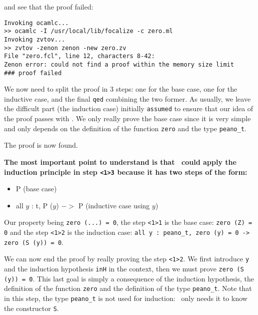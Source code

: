 \documentclass[11pt,a4paper,twoside,onecolumn,fullpage]{article}
\begin{document}
{\scriptsize
}

\noindent and see that the proof failed:
{\scriptsize
\begin{verbatim}
Invoking ocamlc...
>> ocamlc -I /usr/local/lib/focalize -c zero.ml
Invoking zvtov...
>> zvtov -zenon zenon -new zero.zv
File "zero.fcl", line 12, characters 8-42:                     
Zenon error: could not find a proof within the memory size limit
### proof failed
\end{verbatim}}

We now need to split the proof in 3 steps: one for the base case, one
for the inductive case, and the final \lstinline"qed" combining the
two former. As usually, we leave the difficult part (the induction
case) initially \lstinline"assumed" to ensure that our idea of the
proof passes with \zenon.  We only really prove the base case since it
is very simple and only depends on the definition of the function
\lstinline"zero" and the type \lstinline"peano_t".

{\scriptsize
}

The proof is now found. {\bf The most important point to understand is that
\zenon\ could apply the induction principle in step \lstinline"<1>3"
because it has two steps of the form:
\begin{itemize}
\item P (base case)
\item all $y$ : t, P ($y$) $->$ P (inductive case using $y$)
\end{itemize}
}

Our property being \lstinline"zero (...) = 0", the step \lstinline"<1>1"
is the base case: \lstinline"zero (Z) = 0" and the step \lstinline"<1>2"
is the induction case:
\lstinline"all y : peano_t, zero (y) = 0 -> zero (S (y)) = 0".

We can now end the proof by really proving the step \lstinline"<1>2". We
first introduce \lstinline"y" and the induction hypothesis \lstinline"inH"
in the context, then we must prove \lstinline"zero (S (y)) = 0". This last
goal is simply a consequence of the induction hypothesis, the definition of
the function \lstinline"zero" and the definition of the type
\lstinline"peano_t". Note that in this step, the type \lstinline"peano_t"
is not used for induction: \zenon\ only needs it to know the constructor
\lstinline"S".

{\scriptsize
}
\end{document}
